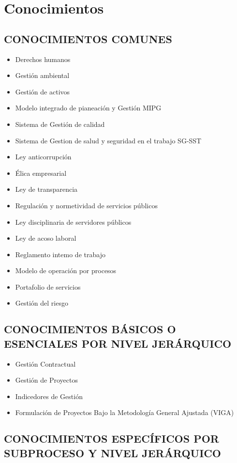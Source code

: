 \documentclass[a5paper]{book}%
\begin{document}
\section{Conocimientos}

\subsection{CONOCIMIENTOS COMUNES}

\begin{itemize}
	\item Derechos humanos
	\item Gestión ambiental
	\item Gestión de activos
	\item Modelo integrado de pianeación y Gestión MIPG
	\item Sistema de Gestión de calidad
	\item Sistema de Gestion de salud y seguridad en el trabajo SG-SST
	\item Ley anticorrupción
	\item Élica empresarial
	\item Ley de transparencia
	\item Regulación y normetividad de servicios públicos
	\item Ley disciplinaria de servidores públicos
	\item Ley de acoso laboral
	\item Reglamento intemo de trabajo
	\item Modelo de operación por procesos
	\item Portafolio de servicios
	\item Gestión del riesgo
\end{itemize}

\subsection{CONOCIMIENTOS  BÁSICOS O ESENCIALES  POR NIVEL JERÁRQUICO}


\begin{itemize}
	\item Gestión Contractual
	\item  Gestión de Proyectos
	\item Indicedores de Gestión
	\item Formulación de Proyectos Bajo la Metodología General Ajustada (VIGA)
\end{itemize}

\subsection{CONOCIMIENTOS ESPECÍFICOS POR SUBPROCESO Y NIVEL JERÁRQUICO}
\end{document}
